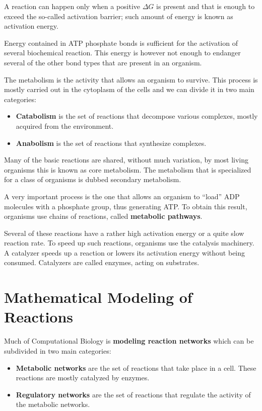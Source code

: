 A reaction can happen only when a positive $\Delta G$ is present and that is
enough to exceed the so-called activation barrier; such amount of energy is known
as activation energy.

Energy contained in ATP phosphate bonds is sufficient for the activation of
several biochemical reaction. This energy is however not enough to endanger several
of the other bond types that are present in an organism.

The metabolism is the activity that allows an organism to survive. This process
is mostly carried out in the cytoplasm of the cells and we can divide it in two
main categories:
\begin{itemize}
    \item \textbf{Catabolism} is the set of reactions that decompose various
          complexes, mostly acquired from the environment.
    \item \textbf{Anabolism} is the set of reactions that synthesize complexes.
\end{itemize}

Many of the basic reactions are shared, without much variation, by most living
organisms this is known as core metabolism. The metabolism that is specialized
for a class of organisms is dubbed secondary metabolism.

A very important process is the one that allows an organism to “load” ADP molecules
with a phosphate group, thus generating ATP. To obtain this result, organisms use
chains of reactions, called \textbf{metabolic pathways}.

Several of these reactions have a rather high activation energy or a quite slow
reaction rate. To speed up such reactions, organisms use the catalysis machinery.
A catalyzer speeds up a reaction or lowers its activation energy without being
consumed. Catalyzers are called enzymes, acting on substrates.
\section{Mathematical Modeling of Reactions}
Much of Computational Biology is \textbf{modeling reaction networks} which can be
subdivided in two main categories:
\begin{itemize}
    \item \textbf{Metabolic networks} are the set of reactions that take place
          in a cell. These reactions are mostly catalyzed by enzymes.
    \item \textbf{Regulatory networks} are the set of reactions that regulate
          the activity of the metabolic networks.
\end{itemize}
